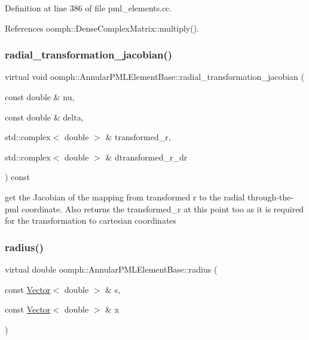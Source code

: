 Definition at line 386 of file pml\+\_\+elements.\+cc.



References oomph\+::\+Dense\+Complex\+Matrix\+::multiply().

\mbox{\label{classoomph_1_1AnnularPMLElementBase_a609c9b6bb60d9bc0de871e9731654805}} 
\subsubsection{\texorpdfstring{radial\+\_\+transformation\+\_\+jacobian()}{radial\_transformation\_jacobian()}}
{\footnotesize\ttfamily virtual void oomph\+::\+Annular\+P\+M\+L\+Element\+Base\+::radial\+\_\+transformation\+\_\+jacobian (\begin{DoxyParamCaption}\item[{const double \&}]{nu,  }\item[{const double \&}]{delta,  }\item[{std\+::complex$<$ double $>$ \&}]{transformed\+\_\+r,  }\item[{std\+::complex$<$ double $>$ \&}]{dtransformed\+\_\+r\+\_\+dr }\end{DoxyParamCaption}) const\hspace{0.3cm}{\ttfamily [pure virtual]}}



get the Jacobian of the mapping from transformed r to the radial through-\/the-\/pml coordinate. Also returns the transformed\+\_\+r at this point too as it is required for the transformation to cartesian coordinates 

\mbox{\label{classoomph_1_1AnnularPMLElementBase_a5d3de2d99d848942e6fb533fd9cf58da}} 
\subsubsection{\texorpdfstring{radius()}{radius()}}
{\footnotesize\ttfamily virtual double oomph\+::\+Annular\+P\+M\+L\+Element\+Base\+::radius (\begin{DoxyParamCaption}\item[{const \hyperlink{classoomph_1_1Vector}{Vector}$<$ double $>$ \&}]{s,  }\item[{const \hyperlink{classoomph_1_1Vector}{Vector}$<$ double $>$ \&}]{x }\end{DoxyParamCaption})\hspace{0.3cm}{\ttfamily [pure virtual]}}



